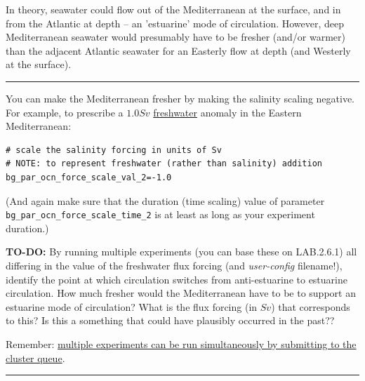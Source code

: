 In theory, seawater could flow out of the Mediterranean at the surface, and in from the Atlantic at depth -- an 'estuarine' mode of circulation. However, deep Mediterranean seawater would presumably have to be fresher (and/or warmer) than the adjacent Atlantic seawater for an Easterly flow at depth (and Westerly at the surface).

\vspace{1mm}\noindent\rule{4cm}{0.5pt}\vspace{2mm}

\noindent You can make the Mediterranean fresher by making the salinity scaling negative. For example, to prescribe a $1.0 Sv$ \uline{freshwater} anomaly in the Eastern Mediterranean:

\vspace{-2mm}\small\begin{verbatim}
# scale the salinity forcing in units of Sv
# NOTE: to represent freshwater (rather than salinity) addition
bg_par_ocn_force_scale_val_2=-1.0
\end{verbatim}\normalsize\vspace{-2mm}
(And again make sure that the duration (time scaling) value of parameter \\\texttt{\small bg\_par\_ocn\_force\_scale\_time\_2} is at least as long as your experiment duration.)

\vspace{1mm}
\noindent \textbf{TO-DO:} By running multiple experiments (you can base these on \textsf{\footnotesize LAB.2.6.1}) all differing in the value of the freshwater flux forcing (and \textit{user-config} filename!), identify the point at which circulation switches from anti-estuarine to estuarine circulation. How much fresher would the Mediterranean have to be to support an estuarine mode of circulation? What is the flux forcing (in $Sv$) that corresponds to this? Is this a something that could have plausibly occurred in the past??

\vspace{1mm}
\noindent Remember: \uline{multiple experiments can be run simultaneously by submitting to the cluster queue}.

\vspace{1mm}\noindent\rule{4cm}{0.5pt}\vspace{2mm}

